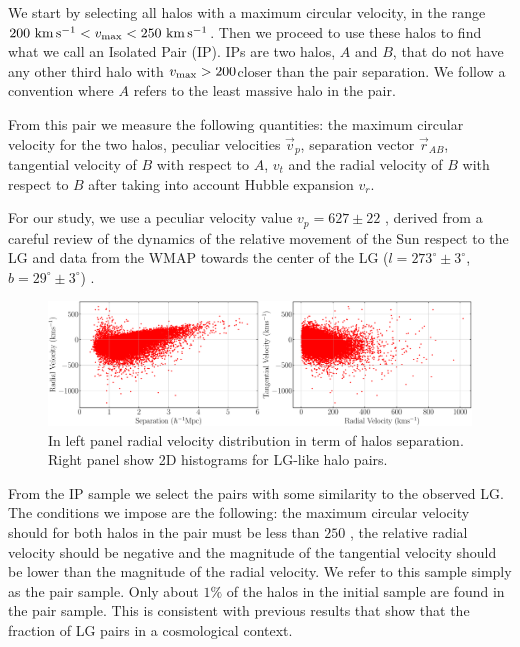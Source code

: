 \documentclass[usenatbib]{mnras}
\newcommand{\kms}{{\ifmmode{\ {\rm km\, {s}^{-1}}}\else{\ km s$^{-1}$}\fi}}
\begin{document}
We start by selecting all halos with a maximum circular velocity, in the range $200 \kms < v_{\rm max}< 250 \kms$. Then we proceed to use these halos to find what we call an Isolated Pair
(IP). IPs are two halos, $A$ and $B$, that do not have any other third halo with $v_{\rm max}>200$\kms closer than the pair separation. We follow a convention where $A$ refers to the least massive halo in the pair.

From this pair we measure the following quantities: the maximum circular velocity for the two halos, peculiar velocities $\vec{v}_p$, separation vector $\vec{r}_{AB}$, tangential velocity of $B$ with
respect to $A$, $v_{t}$ and the radial velocity of $B$ with respect to $B$ after taking into account Hubble expansion $v_r$.

For our study, we use a peculiar velocity value $v_p=627\pm 22$ \kms, derived from a careful review of the dynamics of the relative movement of the Sun respect to the LG and data from the WMAP towards the center of the LG ($l=273^{\circ}\pm 3^{\circ}$, $b=29^{\circ}\pm 3^{\circ}$) \cite{2009PhRvD..80d3005E}.

\begin{figure}
\begin{center}
  \includegraphics[width=1.0\textwidth]{both_06.pdf}
\end{center}
\caption{In left panel radial velocity distribution in term of halos separation. Right panel show 2D histograms for LG-like halo pairs.} 
\label{fig:distri_total}
\end{figure}

From the IP sample we select the pairs with some similarity to the observed LG. The conditions we impose are the following: the maximum circular velocity should for both halos in the pair must be less than $250$ \kms, the relative radial velocity should be negative and the magnitude of the tangential velocity should be lower than the magnitude of the radial velocity. We refer to this sample simply as the pair sample. Only about $1\%$ of the halos in the initial sample are found in the pair sample. This is consistent with previous results that show that the fraction of LG pairs in a cosmological context.
\end{document}
